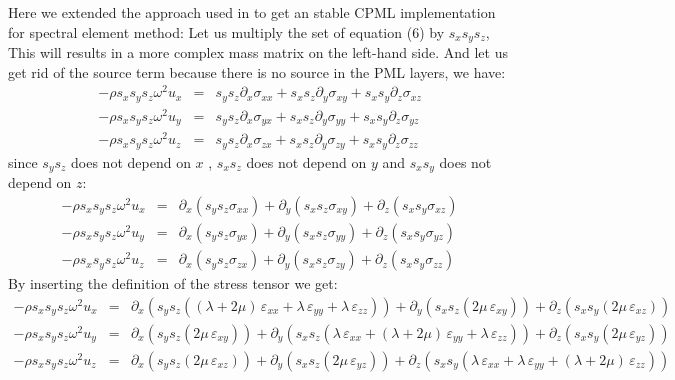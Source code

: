 \documentclass[onecolumn,extra]{gji_modified_cours_UPPA}
\renewcommand{\cite}[1]{\citet{#1}}
\begin{document}
\noindent
Here we extended the approach used in \cite{Mat11} to get an stable CPML implementation for spectral element method: Let us multiply the set of equation (6) by $s_x s_y s_z$,
This will results in a more complex mass matrix on the left-hand side.
And let us get rid of the source term because there is no source in the PML layers, we have:
\begin{eqnarray}
- \rho s_x s_y s_z \omega^2 u_x  & = & s_y s_z \partial_x \sigma_{xx} + s_x s_z \partial_y \sigma_{xy} + s_x s_y \partial_z \sigma_{xz} \nonumber \\
- \rho s_x s_y s_z \omega^2 u_y  & = & s_y s_z \partial_x \sigma_{yx} + s_x s_z \partial_y \sigma_{yy} + s_x s_y \partial_z \sigma_{yz} \nonumber \\
- \rho s_x s_y s_z \omega^2 u_z  & = & s_y s_z \partial_x \sigma_{zx} + s_x s_z \partial_y \sigma_{zy} + s_x s_y \partial_z \sigma_{zz}
\end{eqnarray}
%
\noindent since $s_y s_z$ does not depend on $x$ ,
$s_x s_z$ does not depend on $y$ and $s_x s_y$ does not depend on $z$:
%
\begin{eqnarray}
- \rho s_x s_y s_z \omega^2 u_x  & = &  \partial_x (s_y s_z \sigma_{xx}) + \partial_y (s_x s_z \sigma_{xy}) + \partial_z (s_x s_y \sigma_{xz}) \nonumber \\
- \rho s_x s_y s_z \omega^2 u_y  & = &  \partial_x (s_y s_z \sigma_{yx}) + \partial_y (s_x s_z \sigma_{yy}) + \partial_z (s_x s_y \sigma_{yz}) \nonumber \\
- \rho s_x s_y s_z \omega^2 u_z  & = &  \partial_x (s_y s_z \sigma_{zx}) + \partial_y (s_x s_z \sigma_{zy}) + \partial_z (s_x s_y \sigma_{zz})
\end{eqnarray}
\noindent By inserting the definition of the stress tensor we get:
\begin{eqnarray}
- \rho s_x s_y s_z \omega^2 u_x  & = &  \partial_x (s_y s_z ((\lambda + 2 \mu) \, \varepsilon_{xx} + \lambda \, \varepsilon_{yy} + \lambda \, \varepsilon_{zz}))
+ \partial_y (s_x s_z (2 \mu \, \varepsilon_{xy})) + \partial_z (s_x s_y (2 \mu \, \varepsilon_{xz})) \nonumber \\
- \rho s_x s_y s_z \omega^2 u_y  & = &  \partial_x (s_y s_z (2 \mu \, \varepsilon_{xy}))
+ \partial_y (s_x s_z (\lambda \, \varepsilon_{xx} + (\lambda + 2 \mu) \, \varepsilon_{yy} + \lambda \, \varepsilon_{zz}))
+ \partial_z (s_x s_y (2 \mu \, \varepsilon_{yz})) \nonumber \\
- \rho s_x s_y s_z \omega^2 u_z  & = &  \partial_x (s_y s_z (2 \mu \, \varepsilon_{xz}))
+ \partial_y (s_x s_z (2 \mu \, \varepsilon_{yz}))
+ \partial_z (s_x s_y (\lambda \, \varepsilon_{xx} + \lambda \, \varepsilon_{yy} + (\lambda + 2 \mu) \, \varepsilon_{zz}))
\end{eqnarray}
\end{document}
